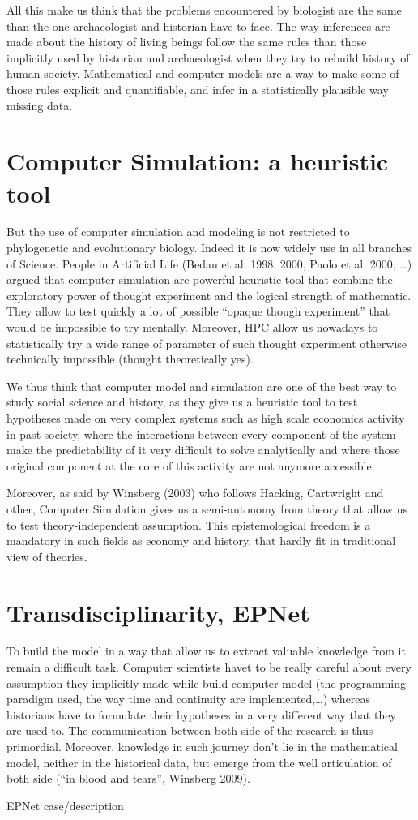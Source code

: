 \documentclass[a4paper]{article}
\begin{document}
All this make us think that the problems encountered by biologist are the same than the one archaeologist and historian have to face. The way inferences are made about the history of living beings follow the same rules than those implicitly used by historian and archaeologist when they try to rebuild history of human society. Mathematical and computer models are a way to make some of those rules explicit and quantifiable, and infer in a statistically plausible way missing data.

\section{Computer Simulation: a heuristic tool}
But the use of computer simulation and modeling is not restricted to phylogenetic and evolutionary biology. Indeed it is now widely use in all branches of Science. People in Artificial Life (Bedau et al. 1998, 2000, Paolo et al. 2000, \ldots) argued that computer simulation are powerful heuristic tool that combine the exploratory power of thought experiment and the logical strength of mathematic. They allow to test quickly a lot of possible ``opaque though experiment'' that would be impossible to try mentally.
Moreover, HPC allow us nowadays to statistically try a wide range of parameter of such thought experiment otherwise technically impossible (thought theoretically yes).

We thus think that computer model and simulation are one of the best way to study social science and history, as they give  us a heuristic tool to test hypotheses made on very complex systems such as high scale economics activity in past society, where the interactions between every component of the system make the predictability of it very difficult to solve analytically and where those original component at the core of this activity are not anymore accessible.

Moreover, as said by Winsberg (2003) who follows Hacking, Cartwright and other, Computer Simulation gives us a semi-autonomy from theory that allow us to test theory-independent assumption. This epistemological freedom is a mandatory in such fields as economy and history, that hardly fit in traditional view of theories.


\section{Transdisciplinarity, EPNet}

To build the model in a way that allow us to extract valuable knowledge from it remain a difficult task. Computer scientists havet to be really careful about every assumption they implicitly made while build computer model (the programming paradigm used, the way time and continuity are implemented,\ldots) whereas historians have to formulate their hypotheses in a very different way that they are used to. The communication between both side of the research is thus primordial. Moreover, knowledge in such journey don't lie in the mathematical model, neither in the historical data, but emerge from the well articulation of both side (``in blood and tears'', Winsberg 2009).

EPNet case/description
\end{document}
